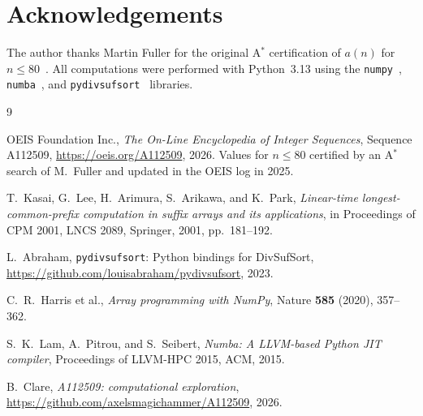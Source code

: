 \documentclass[11pt,a4paper]{article}
\theoremstyle{plain}
\theoremstyle{definition}
\theoremstyle{remark}
\begin{document}
\section*{Acknowledgements}

The author thanks Martin Fuller for the original A$^*$ certification of
$a(n)$ for $n \le 80$~\cite{oeis}.  All computations were performed with
Python~3.13 using the \texttt{numpy}~\cite{numpy},
\texttt{numba}~\cite{numba}, and
\texttt{pydivsufsort}~\cite{pydivsufsort} libraries.

\begin{thebibliography}{9}

  OEIS Foundation Inc.,
  \emph{The On-Line Encyclopedia of Integer Sequences},
  Sequence A112509,
  \url{https://oeis.org/A112509}, 2026.
  Values for $n \le 80$ certified by an A$^*$ search of M.~Fuller and
  updated in the OEIS log in 2025.

  T.~Kasai, G.~Lee, H.~Arimura, S.~Arikawa, and K.~Park,
  \emph{Linear-time longest-common-prefix computation in suffix
  arrays and its applications},
  in Proceedings of CPM 2001, LNCS 2089, Springer, 2001,
  pp.~181--192.

  L.~Abraham,
  \texttt{pydivsufsort}: Python bindings for DivSufSort,
  \url{https://github.com/louisabraham/pydivsufsort}, 2023.

  C.~R.~Harris et al.,
  \emph{Array programming with NumPy},
  Nature \textbf{585} (2020), 357--362.

  S.~K.~Lam, A.~Pitrou, and S.~Seibert,
  \emph{Numba: A LLVM-based Python JIT compiler},
  Proceedings of LLVM-HPC 2015, ACM, 2015.

  B.~Clare,
  \emph{A112509: computational exploration},
  \url{https://github.com/axelsmagichammer/A112509}, 2026.

\end{thebibliography}
\end{document}
